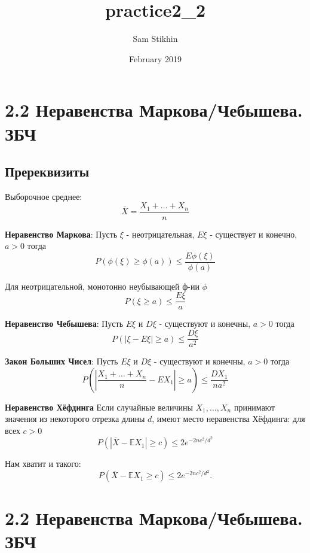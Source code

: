 \documentclass[a4paper, 14pt]{extarticle}
\title{practice2_2}
\author{Sam Stikhin}
\date{February 2019}
\begin{document}
\section*{2.2 Неравенства Маркова/Чебышева. ЗБЧ}
\subsection*{Пререквизиты}
Выборочное среднее:
$$\overline{X} = \frac{X_1 + \ldots + X_n}{n}$$

\textbf{Неравенство Маркова}: Пусть $\xi$ - неотрицательная, $E\xi$ - существует и конечно, $a>0$ тогда
$$P(\phi(\xi) \geq \phi(a)) \leq \frac{E\phi(\xi)}{\phi(a)}$$

Для неотрицательной, монотонно неубывающей ф-ии $\phi$
$$P(\xi \geq a) \leq \frac{E\xi}{a}$$

\textbf{Неравенство Чебышева}: Пусть $E\xi$ и $D\xi$ - существуют и конечны, $a>0$ тогда
$$P(|\xi - E\xi| \geq a) \leq \frac{D\xi}{a^2}$$

\textbf{Закон Больших Чисел}: Пусть $E\xi$ и $D\xi$ - существуют и конечны, $a>0$ тогда
$$P\left(\left|\frac{X_1 + \ldots + X_n}{n} - EX_1\right| \geq a\right) \leq \frac{DX_1}{na^2}$$

\textbf{Неравенство Хёфдинга} Если случайные величины $X_1,\dots,X_n$ принимают значения из некоторого отрезка длины $d$, имеют место неравенства Хёфдинга: для всех $c>0$
$$P({|\overline{X}-\mathbb{E}{X}_1|\geq c})\leq 2e^{-2nc^2/d^2}$$

Нам хватит и такого:
$$P({\overline{X}-\mathbb{E}{X}_1\geq c})\leq 2e^{-2nc^2/d^2}.$$

\newpage
\section*{2.2 Неравенства Маркова/Чебышева. ЗБЧ}
\end{document}
